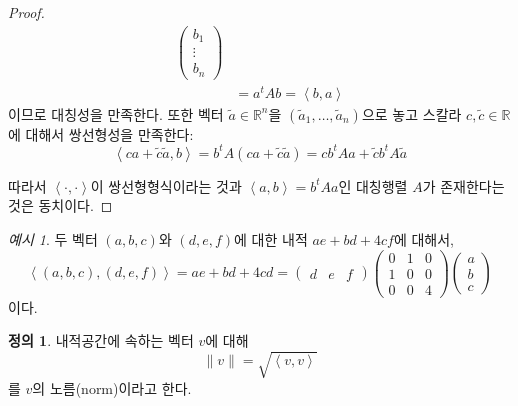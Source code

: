 \documentclass[unfonts,oneside,a4paper]{oblivoir}
\theoremstyle{definition}
\newtheorem{definition}{정의}[section]
\theoremstyle{theorem}
\theoremstyle{theorem}
\theoremstyle{remark}
\theoremstyle{remark}
\theoremstyle{remark}
\newtheorem*{example}{예시}
\theoremstyle{remark}
\renewcommand{\vec}[1]{\bm{\mathit{#1}}}
\begin{document}
\begin{proof}
\begin{align*}
\begin{pmatrix}
                                        b_1\\
                                        \vdots\\
                                        b_n
                                    \end{pmatrix}\\
                                    &= \vec a^t A \vec b = \left<\vec b, \vec a\right>
    \end{align*}
    이므로 대칭성을 만족한다.
    또한 벡터 $\tilde{\vec a} \in \mathbb R^n$을 $(\tilde a_1, \dots, \tilde a_n)$으로 놓고 스칼라 $c, \tilde c \in \mathbb R$에 대해서 쌍선형성을 만족한다:
    \begin{equation*}
        \left<c \vec a + \tilde c \tilde{\vec a}, \vec b\right> = \vec b^t A (c \vec a + \tilde c \tilde{\vec a}) = c \vec b^t A \vec a + \tilde c \vec b^t A \tilde{\vec a}
    \end{equation*}

    따라서 $\left<\cdot, \cdot\right>$이 쌍선형형식이라는 것과 $\left<\vec a, \vec b\right> = \vec b^t A \vec a$인 대칭행렬 $A$가 존재한다는 것은 동치이다.
\end{proof}

\begin{example}
    두 벡터 $(a, b, c)$와 $(d, e, f)$에 대한 내적 $ae + bd + 4cf$에 대해서,
    \begin{equation*}
        \left<(a, b, c), (d, e, f)\right> = ae + bd + 4cd =
        \begin{pmatrix}
            d & e & f
        \end{pmatrix}
        \begin{pmatrix}
            0 & 1 & 0\\
            1 & 0 & 0\\
            0 & 0 & 4
        \end{pmatrix}
        \begin{pmatrix}
            a \\ b \\ c
        \end{pmatrix}
    \end{equation*}
    이다.
\end{example}

\begin{definition}
    내적공간에 속하는 벡터 $\vec v$에 대해
    \begin{equation*}
        \lVert \vec v \rVert = \sqrt{\left<\vec v, \vec v\right>}
    \end{equation*}
    를 $\vec v$의 노름(norm)이라고 한다.
\end{definition}
\end{document}
